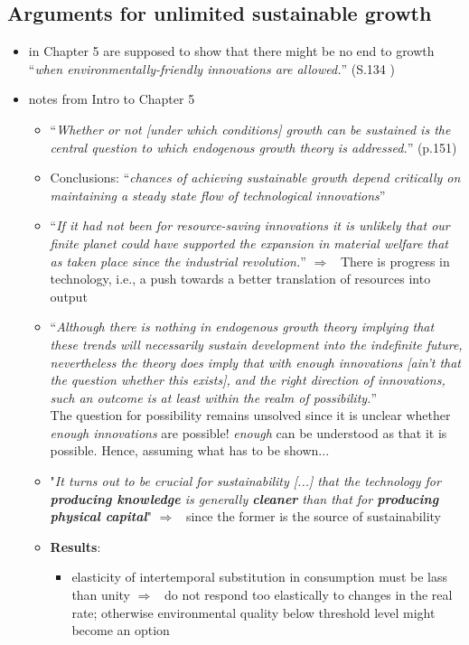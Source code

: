 \documentclass[12pt]{article}
\newcommand{\ar}{$\Rightarrow$ \ }
\begin{document}
\subsection{Arguments for unlimited sustainable growth}
\begin{itemize}
\item \cite{EndGrowthAghion1998} in Chapter 5 are supposed to show that there might be no end to growth ``\textit{when environmentally-friendly innovations are allowed.}'' (S.134 \cite{Acemoglu2012TheChange})
\item notes from \cite{EndGrowthAghion1998} Intro to Chapter 5
\begin{itemize}
\item ``\textit{Whether or not [under which conditions] growth can be sustained is the central question to which endogenous growth theory is addressed.}'' (p.151)
\item  Conclusions: ``\textit{chances of achieving sustainable growth depend critically on maintaining a steady state flow of technological innovations}''
\item ``\textit{If it had not been for resource-saving innovations it is unlikely that \textit{our finite planet} could have supported the expansion in material welfare that as taken place since the industrial revolution.}'' \ar There is progress in technology, i.e., a push towards a better translation of resources into output
\item ``\textit{Although there is nothing in endogenous growth theory implying that these trends will necessarily sustain development into the indefinite future, nevertheless the theory does imply that with enough innovations [ain't that the question whether this exists], and the right direction of innovations, such an outcome is at least within the realm of possibility.}''
\\
The question for possibility remains unsolved since it is unclear whether \textit{enough innovations} are possible!  \textit{enough} can be understood as that it is possible. Hence, assuming what has to be shown... 
\item "\textit{It turns out to be crucial for sustainability [...] that the technology for \textbf{producing knowledge} is generally \textbf{cleaner} than that for \textbf{producing physical capital}}" \ar since the former is the source of sustainability
\item \textbf{Results}: 
\begin{itemize}
\item elasticity of intertemporal substitution in consumption must be lass than unity \ar do not respond too elastically to changes in the real rate; otherwise environmental quality below threshold level might become an option

\end{itemize}
\end{itemize}
\end{itemize}
\end{document}
